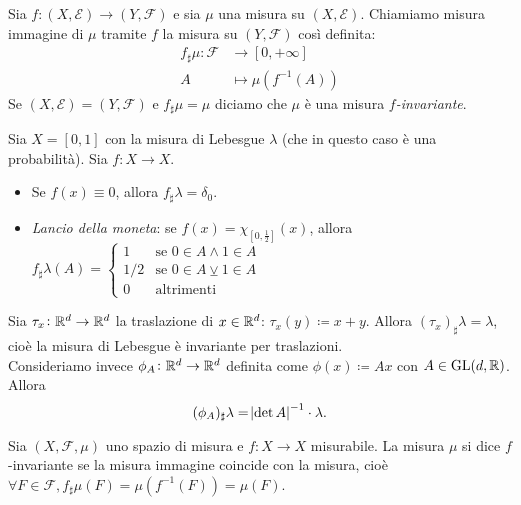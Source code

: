 \begin{definition}
	Sia $ f\colon (X,\mathcal{E}) \to (Y,\mathcal{F}) $ e sia $ \mu $ una misura su $ (X,\mathcal{E}) $. Chiamiamo misura immagine di $ \mu $ tramite $ f $ la misura su $ (Y, \mathcal{F}) $ così definita:
	\begin{align*}
		f_\sharp \mu\colon \mathcal{F} & \to [0,+\infty]                      \\
		A                              & \mapsto \mu \left( f^{-1}(A) \right)
	\end{align*}
	Se $ (X,\mathcal{E}) = (Y,\mathcal{F}) $ e $ f_\sharp\mu = \mu $ diciamo che $ \mu $ è una misura \emph{$ f $-invariante}.
\end{definition}

\begin{example}
	Sia $ X = [0,1] $ con la misura di Lebesgue $ \lambda $ (che in questo caso è una probabilità). Sia $ f\colon X\to X $.
	\begin{itemize}
		\item Se $ f(x) \equiv 0 $, allora $ f_\sharp \lambda = \delta_0 $.
		\item \emph{Lancio della moneta}: se $ f(x) = \chi_{[0,\frac{1}{2}]}(x) $, allora $ f_\sharp \lambda (A) =
		\begin{cases}
			1	& \text{se } 0\in A \wedge 1 \in A \\
			1/2 & \text{se } 0\in A \veebar 1\in A \\
			0			& \text{altrimenti}
		\end{cases} $
	\end{itemize}
\end{example}

\begin{example}
	Sia $ \tau_x\colon \mathbb{R}^d\to\mathbb{R}^d $ la traslazione di $ x\in\mathbb{R}^d $: $ \tau_x(y) \coloneqq x+y $. Allora $ (\tau_x)_\sharp\lambda = \lambda $, cioè la misura di Lebesgue è invariante per traslazioni. \\
    Consideriamo invece $ \phi_A\colon\mathbb{R}^d\to\mathbb{R}^d $ definita come $ \phi(x) \coloneqq Ax $ con $ A \in\mathrm{GL}(d,\mathbb{R}) $. Allora 
    \[
        (\phi_A)_\sharp\lambda = \abs{\det A}^{-1} \cdot \lambda.
    \] 
\end{example}

\begin{definition}
    Sia $ (X, \mathcal{F}, \mu) $ uno spazio di misura e $ f \colon X \to X $ misurabile. La misura $ \mu $ si dice $ f $-invariante se la misura immagine coincide con la misura, cioè $ \forall F \in \mathcal{F}, f_\sharp \mu(F) = \mu(f^{-1}(F)) = \mu(F) $. 
\end{definition}